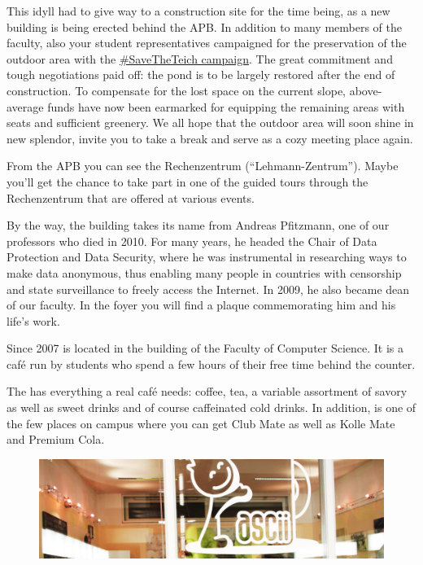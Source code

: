 This idyll had to give way to a construction site for the time being, as a new building is being erected behind the APB. In addition to many members of the faculty, also your student representatives campaigned for the preservation of the outdoor area with the \href{https://savethetei.ch/}{\#SaveTheTeich campaign}.
The great commitment and tough negotiations paid off: the pond is to be largely restored after the end of construction. To compensate for the lost space on the current slope, above-average funds have now been earmarked for equipping the remaining areas with seats and sufficient greenery. We all hope that the outdoor area will soon shine in new splendor, invite you to take a break and serve as a cozy meeting place again.

From the APB you can see the Rechenzentrum (\enquote{Lehmann-Zentrum}). Maybe you'll get the chance to take part in one of the guided tours through the Rechenzentrum that are offered at various events.

By the way, the building takes its name from Andreas Pfitzmann, one of our professors who died in 2010. For many years, he headed the Chair of Data Protection and Data Security, where he was instrumental in researching ways to make data anonymous, thus enabling many people in countries with censorship and state surveillance to freely access the Internet. In 2009, he also became dean of our faculty. In the foyer you will find a plaque commemorating him and his life's work.

\pagebreak


Since 2007 \ascii{} is located in the building of the Faculty of Computer Science. It is a café run by students who spend a few hours of their free time behind the counter.

The \ascii{} has everything a real café needs: coffee, tea, a variable assortment of savory as well as sweet drinks and of course caffeinated cold drinks. In addition, \ascii{} is one of the few places on campus where you can get Club Mate as well as Kolle Mate and Premium Cola.

\begin{figure}[h!]
    \centering
    \includegraphics[width=\linewidth]{img/ascii.jpg}
\end{figure}

